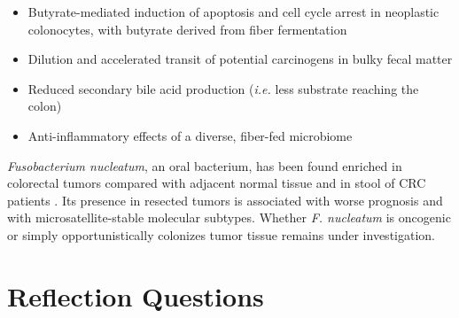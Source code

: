 \documentclass{tufte-handout}
\begin{document}
\begin{itemize}
  \item Butyrate-mediated induction of apoptosis and cell cycle arrest in neoplastic colonocytes, with butyrate derived from fiber fermentation
  \item Dilution and accelerated transit of potential carcinogens in bulky fecal matter
  \item Reduced secondary bile acid production (\textit{i.e.} less substrate reaching the colon)
  \item Anti-inflammatory effects of a diverse, fiber-fed microbiome
\end{itemize}

\textit{Fusobacterium nucleatum}, an oral bacterium, has been found enriched in colorectal tumors compared with adjacent normal tissue and in stool of CRC patients \citep{kosticGenomicAnalysis2012}. Its presence in resected tumors is associated with worse prognosis and with microsatellite-stable molecular subtypes. Whether \textit{F. nucleatum} is oncogenic or simply opportunistically colonizes tumor tissue remains under investigation.

\section{Reflection Questions}
\end{document}
